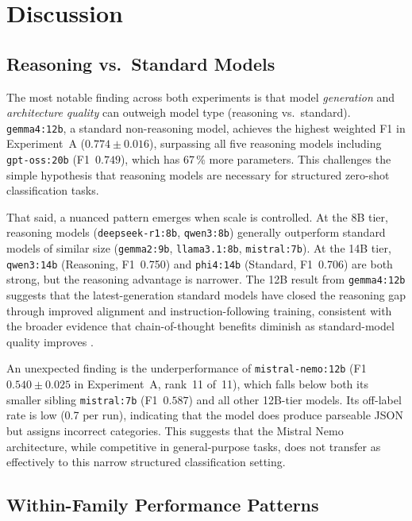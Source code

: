 \documentclass[a4paper,fleqn]{cas-dc}
\begin{document}
\section{Discussion}
\label{sec:discussion}

\subsection{Reasoning vs.\ Standard Models}

The most notable finding across both experiments is that model
\emph{generation} and \emph{architecture quality} can outweigh model
type (reasoning vs.\ standard). \texttt{gemma4:12b}, a standard
non-reasoning model, achieves the highest weighted F1 in
Experiment~A ($0.774 \pm 0.016$), surpassing all five reasoning models
including \texttt{gpt-oss:20b} (F1~$0.749$), which has 67\,\% more
parameters. This challenges the simple hypothesis that reasoning models
are necessary for structured zero-shot classification tasks.

That said, a nuanced pattern emerges when scale is controlled.
At the 8B tier, reasoning models (\texttt{deepseek-r1:8b},
\texttt{qwen3:8b}) generally outperform standard models of similar
size (\texttt{gemma2:9b}, \texttt{llama3.1:8b}, \texttt{mistral:7b}).
At the 14B tier, \texttt{qwen3:14b} (Reasoning, F1~0.750) and
\texttt{phi4:14b} (Standard, F1~0.706) are both strong, but the
reasoning advantage is narrower. The 12B result from \texttt{gemma4:12b}
suggests that the latest-generation standard models have closed the
reasoning gap through improved alignment and instruction-following
training, consistent with the broader evidence that chain-of-thought
benefits diminish as standard-model quality improves
\cite{wei2022chainofthought,guo2025deepseekr1}.

An unexpected finding is the underperformance of \texttt{mistral-nemo:12b}
(F1~$0.540 \pm 0.025$ in Experiment~A, rank~11 of~11), which falls
below both its smaller sibling \texttt{mistral:7b} (F1~$0.587$) and
all other 12B-tier models. Its off-label rate is low (0.7 per run),
indicating that the model does produce parseable JSON but assigns
incorrect categories. This suggests that the Mistral Nemo architecture,
while competitive in general-purpose tasks, does not transfer as
effectively to this narrow structured classification setting.

\subsection{Within-Family Performance Patterns}
\end{document}
